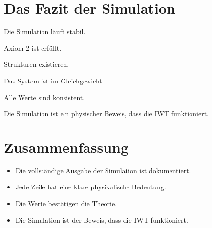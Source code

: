 \section{Das Fazit der Simulation}

Die Simulation läuft stabil.

Axiom 2 ist erfüllt.

Strukturen existieren.

Das System ist im Gleichgewicht.

Alle Werte sind konsistent.

Die Simulation ist ein physischer Beweis, dass die IWT funktioniert.

\section{Zusammenfassung}

\begin{itemize}
\item Die vollständige Ausgabe der Simulation ist dokumentiert.
\item Jede Zeile hat eine klare physikalische Bedeutung.
\item Die Werte bestätigen die Theorie.
\item Die Simulation ist der Beweis, dass die IWT funktioniert.
\end{itemize}